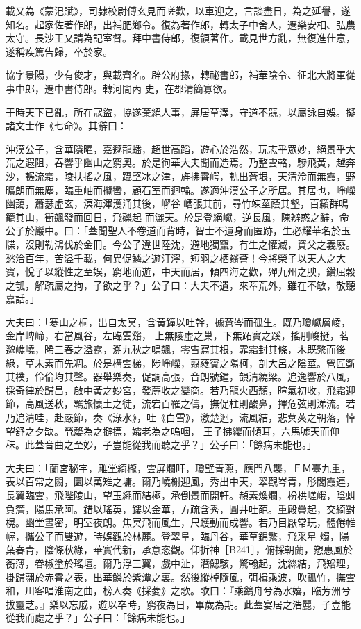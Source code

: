 \begin{pinyinscope}
 載又為《蒙汜賦》，司隸校尉傅玄見而嗟歎，以車迎之，言談盡日，為之延譽，遂知名。起家佐著作郎，出補肥鄉令。復為著作郎，轉太子中舍人，遷樂安相、弘農太守。長沙王乂請為記室督。拜中書侍郎，復領著作。載見世方亂，無復進仕意，遂稱疾篤告歸，卒於家。



 協字景陽，少有俊才，與載齊名。辟公府掾，轉祕書郎，補華陰令、征北大將軍從事中郎，遷中書侍郎。轉河間內
 史，在郡清簡寡欲。



 于時天下已亂，所在寇盜，協遂棄絕人事，屏居草澤，守道不競，以屬詠自娛。擬諸文士作《七命》。其辭曰：



 沖漠公子，含華隱曜，嘉遯龍蟠，超世高蹈，遊心於浩然，玩志乎眾妙，絕景乎大荒之遐阻，吞響乎幽山之窮奧。於是徇華大夫聞而造焉。乃整雲輅，驂飛黃，越奔沙，輾流霜，陵扶搖之風，躡堅冰之津，旌拂霄崿，軌出蒼垠，天清泠而無霞，野曠朗而無塵，臨重岫而攬轡，顧石室而迴輪。遂適沖漠公子之所居。其居也，崢嶸幽藹，蕭瑟虛玄，溟海渾濩涌其後，嶰谷嶆張其前，尋竹竦莖蔭其壑，百籟群鳴籠其山，衝飆發而回日，飛礫起
 而灑天。於是登絕巘，逆長風，陳辨惑之辭，命公子於巖中。曰：「蓋聞聖人不卷道而背時，智士不遺身而匿跡，生必耀華名於玉牒，沒則勒鴻伐於金冊。今公子違世陸沈，避地獨竄，有生之懽滅，資父之義廢。愁洽百年，苦溢千載，何異促鱗之遊汀濘，短羽之栖翳薈！今將榮子以天人之大寶，悅子以縱性之至娛，窮地而遊，中天而居，傾四海之歡，殫九州之腴，鑽屈穀之瓠，解疏屬之拘，子欲之乎？」公子曰：大夫不遺，來萃荒外，雖在不敏，敬聽嘉話。」



 大夫曰：「寒山之桐，出自太冥，含黃鐘以吐幹，據蒼岑而孤生。既乃瓊巘層崚，金岸崥崹，右當風谷，左臨雲谿，
 上無陵虛之巢，下無跖實之蹊，搖刖峻挺，茗邈嶕嶢，晞三春之溢露，溯九秋之鳴飆，零雪寫其根，霏霜封其條，木既繁而後綠，草未素而先凋。於是構雲梯，陟崢嶸，翦蕤賓之陽柯，剖大呂之陰莖。營匠斲其樸，伶倫均其聲。器舉樂奏，促調高張，音朗號鐘，韻清繞梁。追逸響於八風，採奇律於歸昌，啟中黃之妙宮，發蓐收之變商。若乃龍火西頹，暄氣初收，飛霜迎節，高風送秋，羈旅懷土之徒，流宕百罹之儔，撫促柱則酸鼻，揮危弦則涕流。若乃追清哇，赴嚴節，奏《淥水》，吐《白雪》，激楚迴，流風結，悲蓂莢之朝落，悼望舒之夕缺。煢嫠為之擗摽，孀老為之嗚咽，
 王子拂纓而傾耳，六馬噓天而仰秣。此蓋音曲之至妙，子豈能從我而聽之乎？」公子曰：「餘病未能也。」



 大夫曰：「蘭宮秘宇，雕堂綺櫳，雲屏爛旰，瓊壁青蔥，應門八襲，ＦＭ臺九重，表以百常之闕，圜以萬雉之墉。爾乃嶢榭迎風，秀出中天，翠觀岑青，彤閣霞連，長翼臨雲，飛陛陵山，望玉繩而結極，承倒景而開軒。赬素煥爛，枌栱嵯峨，陰虯負簷，陽馬承阿。錯以瑤英，鏤以金華，方疏含秀，圓井吐葩。重殿疊起，交綺對榥。幽堂晝密，明室夜朗。焦冥飛而風生，尺蠖動而成響。若乃目厭常玩，體倦帷幄，攜公子而雙遊，時娛觀於林麓。登翠阜，臨丹谷，華草錦繁，飛采星
 燭，陽葉春青，陰條秋綠，華實代新，承意恣觀。仰折神［B241］，俯採朝蘭，愬惠風於蘅薄，眷椒塗於瑤壇。爾乃浮三翼，戲中沚，潛鰓駭，驚翰起，沈絲結，飛矰理，掛歸翮於赤霄之表，出華鱗於紫潭之裏。然後縱棹隨風，弭楫乘波，吹孤竹，撫雲和，川客唱淮南之曲，榜人奏《採菱》之歌。歌曰：『乘鷁舟兮為水嬉，臨芳洲兮拔靈芝。』樂以忘戚，遊以卒時，窮夜為日，畢歲為期。此蓋宴居之浩麗，子豈能從我而處之乎？」公子曰：「餘病未能也。」




\end{pinyinscope}
